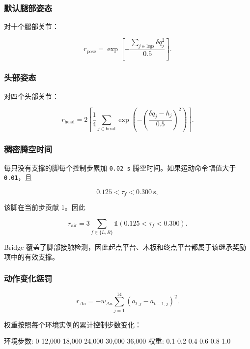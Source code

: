 \documentclass[
  chinese,
  11pt,
  letterpaper,
]{article}
\newenvironment{Shaded}{\begin{snugshade}}{\end{snugshade}}
\newcommand{\NormalTok}[1]{#1}
\renewenvironment{Shaded}{\par\smallskip}{\par\smallskip}
\begin{document}
\subsubsection{默认腿部姿态}\label{ux9ed8ux8ba4ux817fux90e8ux59ffux6001}

对十个腿部关节：

\[
r_{\text{pose}}
=\exp\left[
-\frac{\sum_{j\in\text{legs}}\delta q_j^2}{0.5}
\right].
\]

\subsubsection{头部姿态}\label{ux5934ux90e8ux59ffux6001}

对四个头部关节：

\[
r_{\text{head}}
=2\left[
\frac14\sum_{j\in\text{head}}
\exp\left(-\left(\frac{\delta q_j-h_j}{0.5}\right)^2\right)
\right].
\]

\subsubsection{稠密腾空时间}\label{ux7a20ux5bc6ux817eux7a7aux65f6ux95f4}

每只没有支撑的脚每个控制步累加 \texttt{0.02\ s}
腾空时间。如果运动命令幅值大于 \texttt{0.01}，且

\[
0.125<\tau_f<0.300\ \text{s},
\]

该脚在当前步贡献 1。因此

\[
r_{\text{air}}
=3\sum_{f\in\{L,R\}}
\mathbb 1(0.125<\tau_f<0.300).
\]

Bridge
覆盖了脚部接触检测，因此起点平台、木板和终点平台都属于该继承奖励项中的有效支撑。

\subsubsection{动作变化惩罚}\label{ux52a8ux4f5cux53d8ux5316ux60e9ux7f5a}

\[
r_{\Delta a}
=-w_{\Delta a}
\sum_{j=1}^{14}(a_{t,j}-a_{t-1,j})^2.
\]

权重按照每个环境实例的累计控制步数变化：

\begingroup\setmonofont{PingFang SC}

\begin{Shaded}
\begin{Highlighting}[]
\NormalTok{环境步数:  0     12,000  18,000  24,000  30,000  36,000}
\NormalTok{权重:      0.1   0.2     0.4     0.6     0.8     1.0}
\end{Highlighting}
\end{Shaded}
\end{document}
